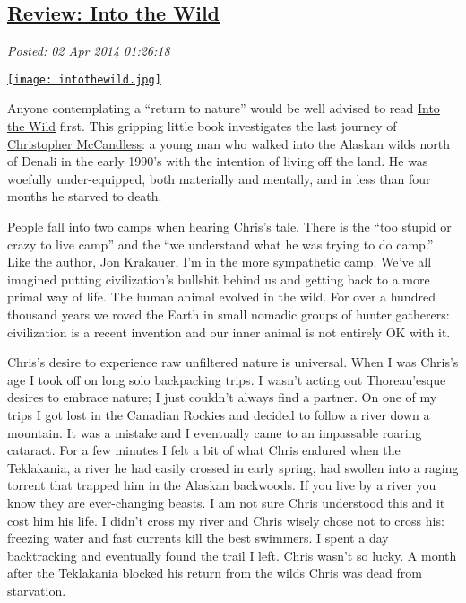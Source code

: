 %

\subsection*{\href{https://bakerjd99.wordpress.com/2014/04/01/review-into-the-wild/}{Review: Into the Wild}}


\noindent\emph{Posted: 02 Apr 2014 01:26:18}
\vspace{6pt}


\captionsetup[floatingfigure]{labelformat=empty}
\begin{floatingfigure}[l]{0.25\textwidth}
\centering
\href{http://www.goodreads.com/book/show/1845.Into\_the\_Wild}{\texttt{[image: intothewild.jpg]}}
\label{fig:4604X0}
\end{floatingfigure} Anyone
contemplating a ``return to nature'' would be well advised to read
\href{http://www.amazon.com/Into-Wild-Jon-Krakauer/dp/0385486804}{Into
the Wild} first. This gripping little book investigates the last journey
of
\href{http://en.wikipedia.org/wiki/Christopher\_McCandless}{Christopher
McCandless}: a young man who walked into the Alaskan wilds north of
Denali in the early 1990's with the intention of living off the land. He
was woefully under-equipped, both materially and mentally, and in less
than four months he starved to death.

People fall into two camps when hearing Chris's tale. There is the ``too
stupid or crazy to live camp'' and the ``we understand what he was
trying to do camp.'' Like the author, Jon Krakauer, I'm in the more
sympathetic camp. We've all imagined putting civilization's bullshit
behind us and getting back to a more primal way of life. The human
animal evolved in the wild. For over a hundred thousand years we roved
the Earth in small nomadic groups of hunter gatherers: civilization is a
recent invention and our inner animal is not entirely OK with it.

Chris's desire to experience raw unfiltered nature is universal. When I
was Chris's age I took off on long solo backpacking trips. I wasn't
acting out Thoreau'esque desires to embrace nature; I just couldn't
always find a partner. On one of my trips I got lost in the Canadian
Rockies and decided to follow a river down a mountain. It was a mistake
and I eventually came to an impassable roaring cataract. For a few
minutes I felt a bit of what Chris endured when the Teklakania, a river
he had easily crossed in early spring, had swollen into a raging torrent
that trapped him in the Alaskan backwoods. If you live by a river you
know they are ever-changing beasts. I am not sure Chris understood this
and it cost him his life. I didn't cross my river and Chris wisely chose
not to cross his: freezing water and fast currents kill the best
swimmers. I spent a day backtracking and eventually found the trail I
left. Chris wasn't so lucky. A month after the Teklakania blocked his
return from the wilds Chris was dead from starvation.

